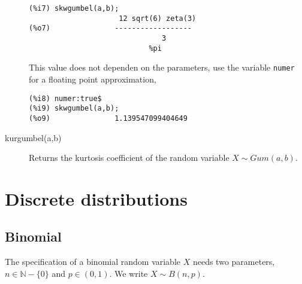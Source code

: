 \documentclass[12pt,a4paper]{article}
\newcommand{\N}{\mathbb{N}}
\begin{document}
\begin{description}
\begin{verbatim}
(%i7) skwgumbel(a,b);
                     12 sqrt(6) zeta(3)
(%o7)               ------------------
                               3
                            %pi
\end{verbatim}
This value does not dependen on the parameters, use the variable \verb|numer| for a floating point approximation,
\begin{verbatim}
(%i8) numer:true$
(%i9) skwgumbel(a,b);
(%o9)               1.139547099404649
\end{verbatim}

\item[kurgumbel(a,b)] Returns the kurtosis coefficient of the random variable  $X \sim Gum(a,b)$.

\end{description}

\section{Discrete distributions}

\subsection{Binomial} \label{binomial}

The specification of a binomial random variable $X$ needs two parameters, $n \in \N - \{0\}$ and $p \in (0,1)$. We write $X \sim B(n,p)$.
\end{document}
